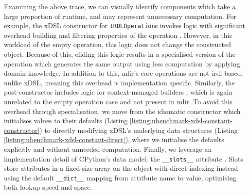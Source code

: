 Examining the above trace, we can visually identify components which take a large proportion of runtime, and may represent unnecessary computation.
For example, the xDSL constructor for \texttt{IRDLOperation}s invokes logic with significant overhead building and filtering properties of the operation . However, in this workload of the empty operation, this logic does not change the constructed object. Because of this, eliding this logic results in a specialised version of the operation which generates the same output using less computation by applying domain knowledge.
In addition to this, \ac{mlir}'s core operations are not \ac{irdl} based, unlike xDSL, meaning this overhead is implementation specific.
Similarly, the post-constructor includes logic for context-managed builders , which is again unrelated to the empty operation case and not present in \ac{mlir}.
To avoid this overhead through specialisation, we move from the idiomatic constructor which initialises values to their defaults (Listing \ref{listing:ubenchmark-xdsl-constant-constructor}) to directly modifying xDSL's underlying data structures (Listing \ref{listing:ubenchmark-xdsl-constant-direct}), where we initialise the defaults explicitly and without unneeded computation.
Finally, we leverage an implementation detail of CPython's data model: the \texttt{__slots__} attribute \cite{pythonsoftwarefoundation3324DataModel}. Slots store attributes in a fixed-size array on the object with direct indexing instead using the default \texttt{__dict__} mapping from attribute name to value, optimising both lookup speed and space.

